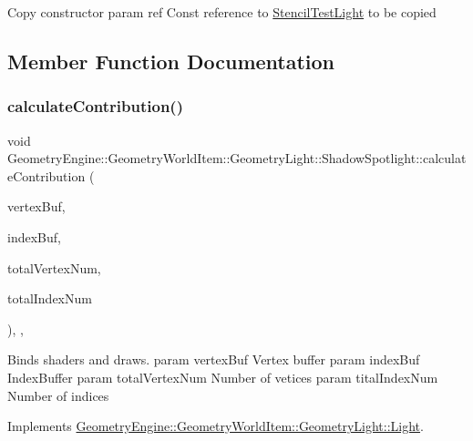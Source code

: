 Copy constructor param ref Const reference to \mbox{\hyperlink{class_geometry_engine_1_1_geometry_world_item_1_1_geometry_light_1_1_stencil_test_light}{Stencil\+Test\+Light}} to be copied 

\subsection{Member Function Documentation}
\mbox{\label{class_geometry_engine_1_1_geometry_world_item_1_1_geometry_light_1_1_shadow_spotlight_a27163f2f8903220d7eaae7aa70c9d6e6}} 
\subsubsection{\texorpdfstring{calculateContribution()}{calculateContribution()}}
{\footnotesize\ttfamily void Geometry\+Engine\+::\+Geometry\+World\+Item\+::\+Geometry\+Light\+::\+Shadow\+Spotlight\+::calculate\+Contribution (\begin{DoxyParamCaption}\item[{Q\+Open\+G\+L\+Buffer $\ast$}]{vertex\+Buf,  }\item[{Q\+Open\+G\+L\+Buffer $\ast$}]{index\+Buf,  }\item[{unsigned int}]{total\+Vertex\+Num,  }\item[{unsigned int}]{total\+Index\+Num }\end{DoxyParamCaption})\hspace{0.3cm}{\ttfamily [override]}, {\ttfamily [protected]}, {\ttfamily [virtual]}}

Binds shaders and draws. param vertex\+Buf Vertex buffer param index\+Buf Index\+Buffer param total\+Vertex\+Num Number of vetices param tital\+Index\+Num Number of indices 

Implements \mbox{\hyperlink{class_geometry_engine_1_1_geometry_world_item_1_1_geometry_light_1_1_light_a58aa2a3520f7aa2b03afcb4123e7530a}{Geometry\+Engine\+::\+Geometry\+World\+Item\+::\+Geometry\+Light\+::\+Light}}.

\mbox{\label{class_geometry_engine_1_1_geometry_world_item_1_1_geometry_light_1_1_shadow_spotlight_a0ea8fd05d26f6e780d352168c28f940d}} 
